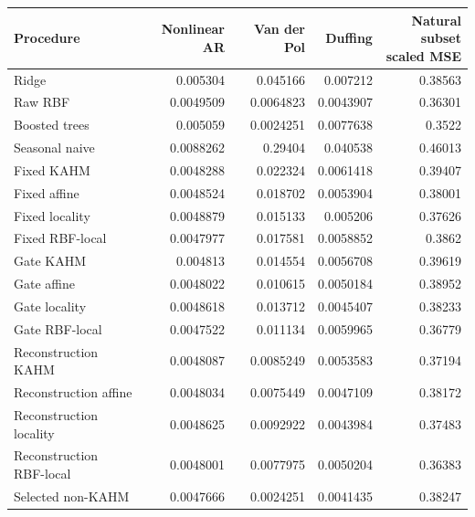 \begin{tabular}{lrrrr}
\toprule
Procedure & Nonlinear AR & Van der Pol & Duffing & \shortstack{Natural subset\\scaled MSE} \\
\midrule
Ridge & 0.005304 & 0.045166 & 0.007212 & 0.38563 \\
Raw RBF & 0.0049509 & 0.0064823 & 0.0043907 & 0.36301 \\
Boosted trees & 0.005059 & 0.0024251 & 0.0077638 & 0.3522 \\
Seasonal naive & 0.0088262 & 0.29404 & 0.040538 & 0.46013 \\
Fixed KAHM & 0.0048288 & 0.022324 & 0.0061418 & 0.39407 \\
Fixed affine & 0.0048524 & 0.018702 & 0.0053904 & 0.38001 \\
Fixed locality & 0.0048879 & 0.015133 & 0.005206 & 0.37626 \\
Fixed RBF-local & 0.0047977 & 0.017581 & 0.0058852 & 0.3862 \\
Gate KAHM & 0.004813 & 0.014554 & 0.0056708 & 0.39619 \\
Gate affine & 0.0048022 & 0.010615 & 0.0050184 & 0.38952 \\
Gate locality & 0.0048618 & 0.013712 & 0.0045407 & 0.38233 \\
Gate RBF-local & 0.0047522 & 0.011134 & 0.0059965 & 0.36779 \\
Reconstruction KAHM & 0.0048087 & 0.0085249 & 0.0053583 & 0.37194 \\
Reconstruction affine & 0.0048034 & 0.0075449 & 0.0047109 & 0.38172 \\
Reconstruction locality & 0.0048625 & 0.0092922 & 0.0043984 & 0.37483 \\
Reconstruction RBF-local & 0.0048001 & 0.0077975 & 0.0050204 & 0.36383 \\
Selected non-KAHM & 0.0047666 & 0.0024251 & 0.0041435 & 0.38247 \\
\bottomrule
\end{tabular}
